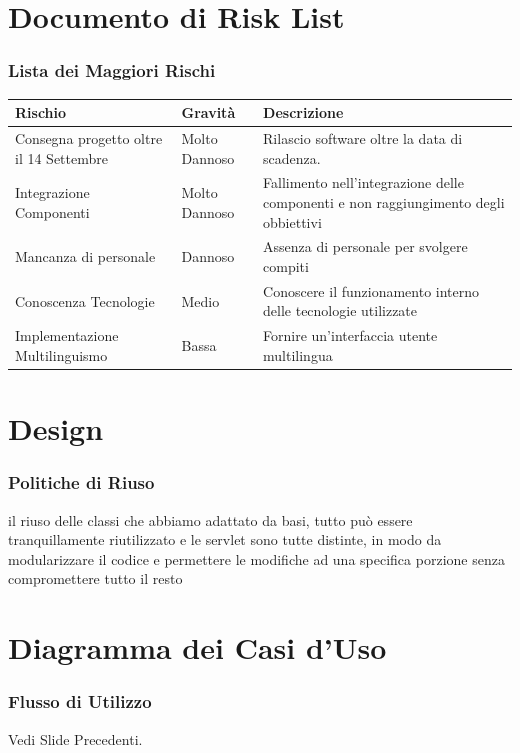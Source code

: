 \documentclass[a4paper,12pt]{beamer}
\begin{document}
\section{Documento di Risk List}
\begin{frame}
\frametitle{Lista dei Maggiori Rischi}
\footnotesize{
\begin{table}[h]
\begin{center}
\begin{tabular}{ p{4cm} p{2cm} p{3cm} } 
\rowcolor{Ash}	
\hline	
Rischio & Gravità & Descrizione  \\ \hline
Consegna progetto oltre il 14 Settembre & Molto Dannoso & Rilascio software oltre la data di scadenza. \\ 
Integrazione Componenti & Molto Dannoso & Fallimento nell'integrazione delle componenti e non raggiungimento degli obbiettivi  \\ 
Mancanza di personale & Dannoso & Assenza di personale per svolgere compiti \\ 
Conoscenza Tecnologie & Medio & Conoscere il funzionamento interno delle tecnologie utilizzate \\ 
Implementazione Multilinguismo & Bassa & Fornire un'interfaccia utente multilingua  \\ \hline
\end{tabular}
\end{center}
\end{table}}
\end{frame}

\pagebreak

\section{Design}
\begin{frame}
\frametitle{Politiche di Riuso}
il riuso delle classi che abbiamo adattato da basi, tutto può essere tranquillamente riutilizzato e le servlet sono tutte distinte, in modo da modularizzare il codice e permettere le modifiche ad una specifica porzione senza compromettere tutto il resto
\end{frame}

\pagebreak

\section{Diagramma dei Casi d'Uso}
\begin{frame}
\frametitle{Flusso di Utilizzo}
Vedi Slide Precedenti.
\end{frame}
\end{document}
